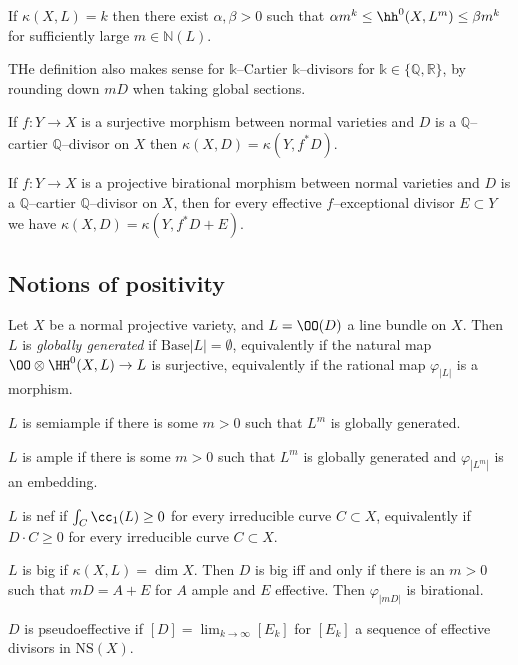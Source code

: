 \begin{remark}
If \(\kappa(X,L)=k\) then there exist \(\alpha,\beta>0\) such that \(\alpha m^k
\leq \hh^0(X,L^m) \leq \beta m^k\)  for sufficiently large \(m\in
\mathbb{N}(L)\).
\end{remark}

THe definition also makes sense for \(\mathbb{k}\)--Cartier
\(\mathbb{k}\)--divisors for \(\mathbb{k}\in \{\mathbb{Q},\mathbb{R}\}\), by
rounding down \(mD\) when taking global sections.

\begin{remark}
If \(f:Y\to X\) is a surjective morphism between normal varieties and \(D\) is a
\(\mathbb{Q}\)--cartier \(\mathbb{Q}\)--divisor on \(X\) then
\(\kappa(X,D)=\kappa(Y,f^\ast D)\).

If \(f:Y\to X\) is a projective birational morphism between normal varieties and
\(D\) is a \(\mathbb{Q}\)--cartier \(\mathbb{Q}\)--divisor on \(X\), then for
every effective \(f\)--exceptional divisor \(E\subset Y\) we have
\(\kappa(X,D)=\kappa(Y,f^\ast D+E)\).
\end{remark}

\subsection{Notions of positivity}
Let \(X\) be a normal projective variety, and \(L=\OO(D)\) a line bundle on
\(X\). Then \(L\) is \emph{globally generated} if \(\text{Base}|L|=\emptyset\),
equivalently if the natural map \(\OO\otimes \HH^0(X,L)\to L\) is surjective,
equivalently if the rational map \(\varphi_{|L|}\) is a morphism.

\(L\) is semiample if there is some \(m>0\) such that \(L^m\) is globally
generated.

\(L\) is ample if there is some \(m>0\) such that \(L^m\) is globally
generated and \(\varphi_{|L^m|}\) is an embedding.

\(L\) is nef if \(\int_{C} \cc_1(L)\geq 0\) for every irreducible curve
\(C\subset X\), equivalently if \(D\cdot C \geq 0\) for every irreducible curve
\(C\subset X\).

\(L\) is big if \(\kappa(X,L)=\dim X\). Then \(D\) is big iff and only if there
is an \(m>0\) such that \(mD=A+E\) for \(A\) ample and \(E\) effective. Then
\(\varphi_{|mD|}\) is birational.

\(D\) is pseudoeffective if \([D]=\lim_{k\to \infty}[E_k]\) for \([E_k]\) a
sequence of effective divisors in \(\text{NS}(X)\).


